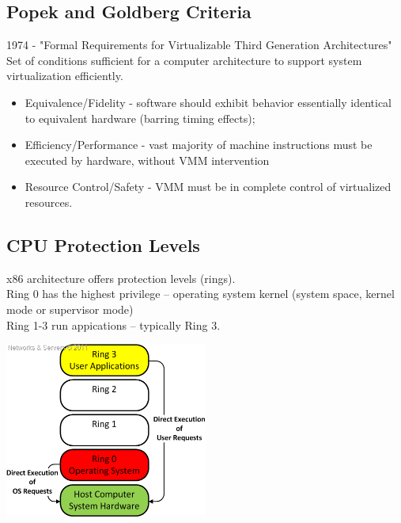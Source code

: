 \documentclass{beamer}
\begin{document}
\subsection{Popek and Goldberg Criteria}
\begin{frame}
1974 - "Formal Requirements for Virtualizable Third Generation Architectures"
\\ \pause
Set of conditions sufficient for a computer architecture to support system virtualization efficiently. \\
\begin{itemize}
\item Equivalence/Fidelity - software should exhibit behavior essentially identical to equivalent hardware (barring timing effects);
\pause
\item Efficiency/Performance - vast majority of machine instructions must be executed by hardware, without VMM intervention
\pause
\item Resource Control/Safety - VMM must be in complete control of virtualized resources.
\end{itemize}
\end{frame}


\subsection{CPU Protection Levels}
\begin{frame}
x86 architecture offers protection levels (rings). \\
\pause
Ring 0 has the highest privilege -- operating system kernel (system space, kernel mode or supervisor mode) \\
\pause
Ring 1-3 run appications -- typically Ring 3.
\pause
\begin{center}
\includegraphics[width=0.5\textwidth]{images/ring0.png}
\end{center}
\end{frame}
\end{document}
